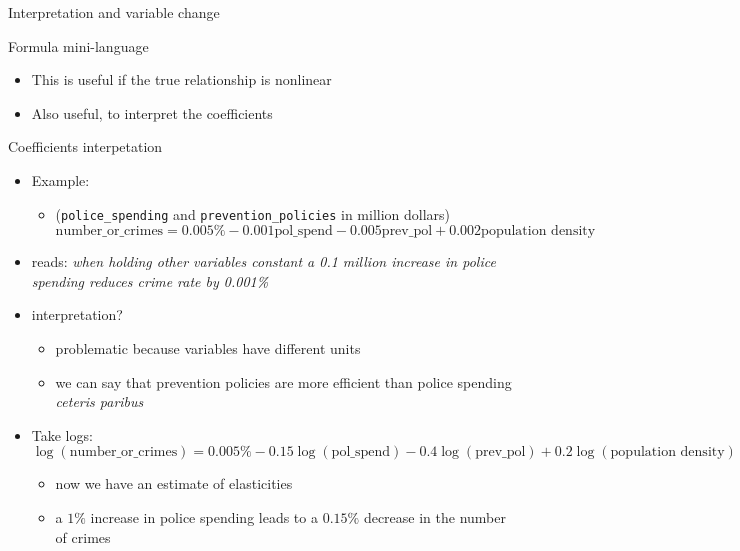 \documentclass[
  ignorenonframetext,
  aspectratio=169,
]{beamer}
\providecommand{\tightlist}{%
  \setlength{\itemsep}{0pt}\setlength{\parskip}{0pt}}\usepackage{longtable,booktabs,array}
\begin{document}
\begin{frame}[fragile]{Interpretation and variable change}
\begin{block}{Formula mini-language}
\begin{itemize}
\tightlist
\item
  This is useful if the true relationship is nonlinear
\item
  Also useful, to interpret the coefficients
\end{itemize}
\end{block}

\begin{block}{Coefficients interpetation}
\protect\hypertarget{coefficients-interpetation}{}
\begin{itemize}
\tightlist
\item
  Example:

  \begin{itemize}
  \tightlist
  \item
    (\texttt{police\_spending} and \texttt{prevention\_policies} in
    million dollars)
    \[\text{number_or_crimes} = 0.005\% - 0.001 \text{pol_spend} - 0.005 \text{prev_pol} + 0.002 \text{population density}\]
  \end{itemize}
\item
  reads: \emph{when holding other variables constant a 0.1 million
  increase in police spending reduces crime rate by 0.001\%}
\item
  interpretation?

  \begin{itemize}
  \tightlist
  \item
    problematic because variables have different units
  \item
    we can say that prevention policies are more efficient than police
    spending \emph{ceteris paribus}
  \end{itemize}
\item
  Take logs:
  \[\log(\text{number_or_crimes}) = 0.005\% - 0.15 \log(\text{pol_spend}) - 0.4 \log(\text{prev_pol}) + 0.2 \log(\text{population density})\]

  \begin{itemize}
  \tightlist
  \item
    now we have an estimate of elasticities
  \item
    a \(1\%\) increase in police spending leads to a \(0.15\%\) decrease
    in the number of crimes
  \end{itemize}
\end{itemize}
\end{block}
\end{frame}
\end{document}

